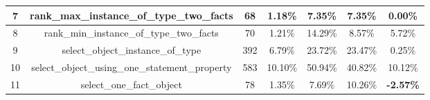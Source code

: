 \begin{table}[h!]
{\begin{tabular}{|c|c|cc|cc|c|}
    7                            & rank\_max\_instance\_of\_type\_two\_facts                                                                              & 68                                                  & 1.18\%                                                                          & 7.35\%                                                                                                 & 7.35\%                                                                                 & 0.00\%                                  \\ \hline
    8                            & rank\_min\_instance\_of\_type\_two\_facts                                                                              & 70                                                  & 1.21\%                                                                          & 14.29\%                                                                                                & 8.57\%                                                                                 & 5.72\%                                  \\ \hline
    9                            & select\_object\_instance\_of\_type                                                                                     & 392                                                 & 6.79\%                                                                          & 23.72\%                                                                                                & 23.47\%                                                                                & 0.25\%                                  \\ \hline
    10                           & select\_object\_using\_one\_statement\_property                                                                        & 583                                                 & 10.10\%                                                                         & 50.94\%                                                                                                & 40.82\%                                                                                & 10.12\%                                 \\ \hline
    11                           & select\_one\_fact\_object                                                                                              & 78                                                  & 1.35\%                                                                          & 7.69\%                                                                                                 & 10.26\%                                                                                & \textbf{-2.57\%}                        \\ \hline

\end{tabular}}
\end{table}
